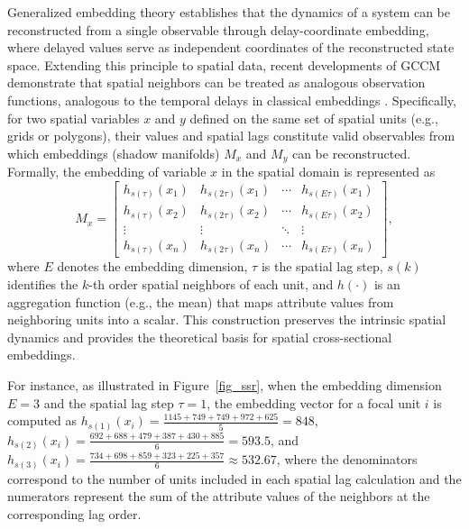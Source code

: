 \documentclass[authoryear,preprint,review,12pt]{elsarticle}
\begin{document}
Generalized embedding theory \citep{Takens1981embedding,Mane1981embedding} establishes that the dynamics of a system can be reconstructed from a single observable through delay-coordinate embedding, where delayed values serve as independent coordinates of the reconstructed state space. Extending this principle to spatial data, recent developments of GCCM demonstrate that spatial neighbors can be treated as analogous observation functions, analogous to the temporal delays in classical embeddings \citep{gao2023gccm}. Specifically, for two spatial variables \(x\) and \(y\) defined on the same set of spatial units (e.g., grids or polygons), their values and spatial lags constitute valid observables from which embeddings (shadow manifolds) \(M_x\) and \(M_y\) can be reconstructed. Formally, the embedding of variable \(x\) in the spatial domain is represented as
\begin{equation}\label{eq-embedding}
M_x = \begin{bmatrix}
h_{s(\tau)}(x_1) & h_{s(2\tau)}(x_1) & \cdots & h_{s(E\tau)}(x_1) \\
h_{s(\tau)}(x_2) & h_{s(2\tau)}(x_2) & \cdots & h_{s(E\tau)}(x_2) \\
\vdots & \vdots & \ddots & \vdots \\
h_{s(\tau)}(x_n) & h_{s(2\tau)}(x_n) & \cdots & h_{s(E\tau)}(x_n)
\end{bmatrix},
\end{equation}
\noindent where \(E\) denotes the embedding dimension, \(\tau\) is the spatial lag step, \(s(k)\) identifies the \(k\)-th order spatial neighbors of each unit, and \(h(\cdot)\) is an aggregation function (e.g., the mean) that maps attribute values from neighboring units into a scalar. This construction preserves the intrinsic spatial dynamics and provides the theoretical basis for spatial cross-sectional embeddings.

For instance, as illustrated in Figure~\ref{fig_ssr}, when the embedding dimension \(E = 3\) and the spatial lag step \(\tau = 1\), the embedding vector for a focal unit \(i\) is computed as \(h_{s(1)}(x_i) = \frac{1145 + 749 + 749 + 972 + 625}{5} = 848\), \(h_{s(2)}(x_i) = \frac{692 + 688 + 479 + 387 + 430 + 885}{6} = 593.5\), and \(h_{s(3)}(x_i) = \frac{734 + 698 + 859 + 323 + 225 + 357}{6} \approx 532.67\), where the denominators correspond to the number of units included in each spatial lag calculation and the numerators represent the sum of the attribute values of the neighbors at the corresponding lag order.
\end{document}

